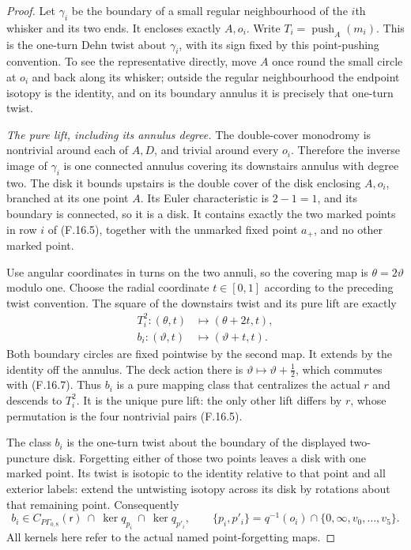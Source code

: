 \begin{proof}
Let $\gamma_i$ be the boundary of a small regular
neighbourhood of the $i$th whisker and its two
ends.  It encloses exactly $A,o_i$.
Write
$T_i=\operatorname{push}_A(m_i)$.
This is the one-turn Dehn twist about $\gamma_i$,
with its sign fixed by this point-pushing
convention.  To see the representative directly,
move $A$ once round the small circle at $o_i$
and back along its whisker; outside the
regular neighbourhood the endpoint isotopy is
the identity, and on its boundary annulus it
is precisely that one-turn twist.

\emph{The pure lift, including its annulus degree.}
The double-cover monodromy is nontrivial around
each of $A,D$, and trivial around every $o_i$.
Therefore the inverse image of $\gamma_i$ is one
connected annulus covering its downstairs
annulus with degree two.  The disk it bounds
upstairs is the double cover of the disk
enclosing $A,o_i$, branched at its one point
$A$.  Its Euler characteristic is $2-1=1$,
and its boundary is connected, so it is a disk.
It contains exactly the two marked points in
row $i$ of (F.16.5), together with the unmarked
fixed point $a_+$, and no other marked point.

Use angular coordinates in turns on the two
annuli, so the covering map is
$\theta=2\vartheta$ modulo one.
Choose the radial coordinate $t\in[0,1]$
according to the preceding twist convention.
The square of the downstairs twist and its
pure lift are exactly
\[
 \begin{split}
  T_i^2:(\theta,t)&\longmapsto(\theta+2t,t),\\
  b_i:(\vartheta,t)&\longmapsto(\vartheta+t,t).
 \end{split}                                                    \tag{F.16.7}
\]
Both boundary circles are fixed pointwise by
the second map.  It extends by the identity
off the annulus.  The deck action there is
$\vartheta\mapsto\vartheta+\tfrac12$, which
commutes with (F.16.7).
Thus $b_i$ is a pure mapping class that
centralizes the actual $r$ and descends
to $T_i^2$.
It is the unique pure lift: the only other
lift differs by $r$, whose permutation is the
four nontrivial pairs (F.16.5).

The class $b_i$ is the one-turn twist about
the boundary of the displayed two-puncture
disk.  Forgetting either of those two points
leaves a disk with one marked point.
Its twist is isotopic to the identity
relative to that point and all exterior
labels: extend the untwisting isotopy
across its disk by rotations about that
remaining point.  Consequently
\[
 b_i\in C_{P\Gamma_{0,8}}(\mathsf r)
        \ \cap\
        \ker q_{p_i}\ \cap\ \ker q_{p'_i},
 \qquad
       \{p_i,p'_i\}=q^{-1}(o_i)\cap
                     \{0,\infty,v_0,\ldots,v_5\}.
                                                               \tag{F.16.8}
\]
All kernels here refer to the actual named
point-forgetting maps.


\end{proof}
